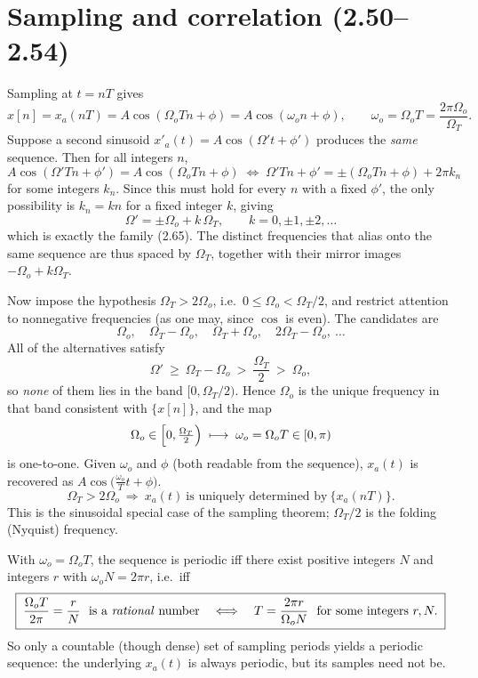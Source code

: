 \section{Sampling and correlation (2.50--2.54)}


Sampling at $t=nT$ gives
\[
x[n]=x_a(nT)=A\cos(\Omega_o T n+\phi)=A\cos(\omega_o n+\phi),
\qquad \omega_o=\Omega_o T=\frac{2\pi\Omega_o}{\Omega_T}.
\]
Suppose a second sinusoid $x'_a(t)=A\cos(\Omega' t+\phi')$ produces the \emph{same} sequence.
Then for all integers $n$,
\[
A\cos(\Omega' Tn+\phi')=A\cos(\Omega_o Tn+\phi)
\;\Longleftrightarrow\;
\Omega' Tn+\phi'=\pm(\Omega_o Tn+\phi)+2\pi k_n
\]
for some integers $k_n$. Since this must hold for every $n$ with a fixed $\phi'$, the only
possibility is $k_n=kn$ for a fixed integer $k$, giving
\[
\boxed{\;\Omega'=\pm\Omega_o+k\,\Omega_T,\qquad k=0,\pm1,\pm2,\dots\;}
\]
which is exactly the family (2.65). The distinct frequencies that alias onto the same sequence
are thus spaced by $\Omega_T$, together with their mirror images $-\Omega_o+k\Omega_T$.

Now impose the hypothesis $\Omega_T>2\Omega_o$, i.e.\ $0\le\Omega_o<\Omega_T/2$, and restrict
attention to nonnegative frequencies (as one may, since $\cos$ is even). The candidates are
\[
\Omega_o,\quad \Omega_T-\Omega_o,\quad \Omega_T+\Omega_o,\quad 2\Omega_T-\Omega_o,\ \dots
\]
All of the alternatives satisfy
\[
\Omega'\ \ge\ \Omega_T-\Omega_o\ >\ \frac{\Omega_T}{2}\ >\ \Omega_o ,
\]
so \emph{none} of them lies in the band $[0,\Omega_T/2)$. Hence $\Omega_o$ is the unique
frequency in that band consistent with $\{x[n]\}$, and the map
\[
\Omega_o\in\Bigl[0,\tfrac{\Omega_T}{2}\Bigr)\;\longmapsto\;\omega_o=\Omega_o T\in[0,\pi)
\]
is one-to-one. Given $\omega_o$ and $\phi$ (both readable from the sequence), $x_a(t)$ is
recovered as $A\cos\bigl(\tfrac{\omega_o}{T}t+\phi\bigr)$.
\[
\boxed{\;\Omega_T>2\Omega_o\ \Longrightarrow\ x_a(t)\ \text{is uniquely determined by}\ \{x_a(nT)\}.\;}
\]
This is the sinusoidal special case of the sampling theorem; $\Omega_T/2$ is the folding
(Nyquist) frequency.


With $\omega_o=\Omega_o T$, the sequence is periodic iff there exist positive integers $N$
and integers $r$ with $\omega_o N=2\pi r$, i.e.\ iff
\[
\boxed{\;\frac{\Omega_o T}{2\pi}=\frac{r}{N}\ \ \text{is a \emph{rational} number}
\quad\Longleftrightarrow\quad T=\frac{2\pi r}{\Omega_o N}\ \ \text{for some integers }r,N .\;}
\]
So only a countable (though dense) set of sampling periods yields a periodic sequence: the
underlying $x_a(t)$ is always periodic, but its samples need not be.

